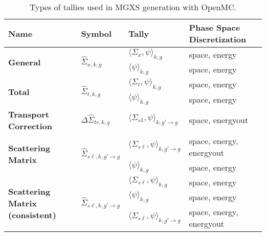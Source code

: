 \begin{table}[h!]
  \centering
  \caption[Tally types for MGXS generation]{Types of tallies used in MGXS generation with OpenMC.}
  \scriptsize
  \label{tab:tally-types}
  \vspace{6pt}
  \begin{tabular}{ m{1.5cm} m{1.2cm} m{2cm} l}
  \toprule
  {\bf Name} &
  {\bf Symbol} &
  {\bf Tally} &
  {\bf Phase Space Discretization} \\

  \midrule

  \multirow{2}{*}{\bf General} & \multirow{2}{*}{$\hat{\Sigma}_{x,k,g}$} & $\langle \Sigma_{x}, \psi \rangle_{k,g}$ & space, energy \\
  \cline{3-4}
  & & $\langle \psi \rangle_{k,g}$ & space, energy \\

  \midrule

  \multirow{2}{*}{\bf Total} & \multirow{2}{*}{$\hat{\Sigma}_{t,k,g}$} & $\langle \Sigma_{t}, \psi \rangle_{k,g}$ & space, energy \\
  \cline{3-4}
  & & $\langle \psi \rangle_{k,g}$ & space, energy \\

  \midrule

  \textbf{\parbox{1.5cm}{\bf Transport Correction}} & $\Delta\hat{\Sigma}_{tr,k,g}$ & $\langle \Sigma_{s1}, \psi \rangle_{k,g'\rightarrow g}$ & space, energyout \\

  \midrule

  \multirow{2}{*}{\parbox{1.5cm}{\bf Scattering Matrix}} & \multirow{2}{*}{$\hat{\Sigma}_{s\ell,k,g'\rightarrow g}$} & $\langle \Sigma_{s\ell}, \psi \rangle_{k,g'\rightarrow g}$ & space, energy, energyout \\
  \cline{3-4}
  & & $\langle \psi \rangle_{k,g}$ & space, energy \\

  \midrule

  \multirow{3}{*}{\parbox{1.5cm}{\bf Scattering Matrix (consistent)}} & \multirow{3}{*}{$\hat{\Sigma}_{s\ell,k,g'\rightarrow g}$} & $\langle \Sigma_{s\ell}, \psi \rangle_{k,g}$ & space, energy \\
  \cline{3-4}
  & & $\langle \psi \rangle_{k,g}$ & space, energy \\
  \cline{3-4}
  & & $\langle \Sigma_{s\ell}, \psi \rangle_{k,g'\rightarrow g}$ & space, energy, energyout \\
  \midrule


\end{tabular}
\end{table}
